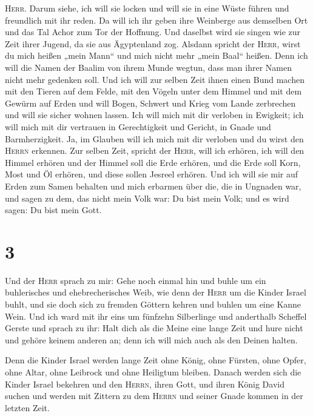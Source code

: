 \textsc{Herr}.  Darum siehe, ich will sie locken und will
sie in eine Wüste führen und freundlich mit ihr reden. 
Da will ich ihr geben ihre Weinberge aus demselben Ort und das Tal Achor
zum Tor der Hoffnung. Und daselbst wird sie singen wie zur Zeit ihrer
Jugend, da sie aus Ägyptenland zog.  Alsdann spricht der
\textsc{Herr}, wirst du mich heißen „mein Mann`` und mich nicht mehr
„mein Baal`` heißen.  Denn ich will die Namen der Baalim
von ihrem Munde wegtun, dass man ihrer Namen nicht mehr gedenken soll.
 Und ich will zur selben Zeit ihnen einen Bund machen mit
den Tieren auf dem Felde, mit den Vögeln unter dem Himmel und mit dem
Gewürm auf Erden und will Bogen, Schwert und Krieg vom Lande zerbrechen
und will sie sicher wohnen lassen.  Ich will mich mit dir
verloben in Ewigkeit; ich will mich mit dir vertrauen in Gerechtigkeit
und Gericht, in Gnade und Barmherzigkeit.  Ja, im Glauben
will ich mich mit dir verloben und du wirst den \textsc{Herrn} erkennen.
 Zur selben Zeit, spricht der \textsc{Herr}, will ich
erhören, ich will den Himmel erhören und der Himmel soll die Erde
erhören,  und die Erde soll Korn, Most und Öl erhören,
und diese sollen Jesreel erhören.  Und ich will sie mir
auf Erden zum Samen behalten und mich erbarmen über die, die in Ungnaden
war, und sagen zu dem, das nicht mein Volk war: Du bist mein Volk; und
es wird sagen: Du bist mein Gott.

\hypertarget{section-2}{%
\section{3}\label{section-2}}

 Und der \textsc{Herr} sprach zu mir: Gehe noch einmal hin
und buhle um ein buhlerisches und ehebrecherisches Weib, wie denn der
\textsc{Herr} um die Kinder Israel buhlt, und sie doch sich zu fremden
Göttern kehren und buhlen um eine Kanne Wein.  Und ich
ward mit ihr eins um fünfzehn Silberlinge und anderthalb Scheffel Gerste
 und sprach zu ihr: Halt dich als die Meine eine lange
Zeit und hure nicht und gehöre keinem anderen an; denn ich will mich
auch als den Deinen halten.

 Denn die Kinder Israel werden lange Zeit ohne König, ohne
Fürsten, ohne Opfer, ohne Altar, ohne Leibrock und ohne Heiligtum
bleiben.  Danach werden sich die Kinder Israel bekehren
und den \textsc{Herrn}, ihren Gott, und ihren König David suchen und
werden mit Zittern zu dem \textsc{Herrn} und seiner Gnade kommen in der
letzten Zeit.

